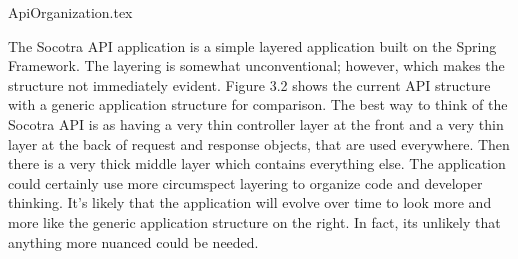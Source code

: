 {ApiOrganization.tex}

The Socotra API application is a simple layered application built on the Spring Framework. The
layering is somewhat unconventional; however, which makes the structure not immediately evident.
Figure 3.2 shows the current API structure with a generic application structure for comparison. The
best way to think of the Socotra API is as having a very thin controller layer at the front and a
very thin layer at the back of request and response objects, that are used everywhere. Then
there is a very thick middle layer which contains everything else. The application could certainly use
more circumspect layering to organize code and developer thinking. It's likely that the application
will evolve over time to look more and more like the generic application structure on the right.
In fact, its unlikely that anything more nuanced could be needed.




